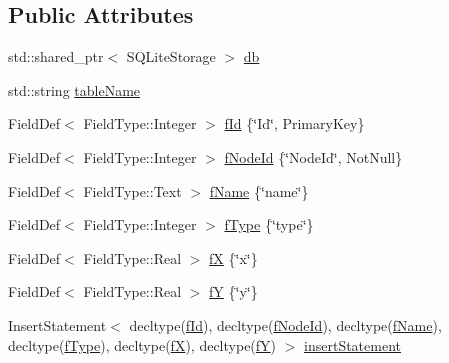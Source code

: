 \subsection*{Public Attributes}
\begin{DoxyCompactItemize}
\item 
std\+::shared\+\_\+ptr$<$ S\+Q\+Lite\+Storage $>$ \mbox{\hyperlink{struct_fish_farms_def_table_1_1_impl_a303f07f885e2da16d0db672caa8b9415}{db}}
\item 
std\+::string \mbox{\hyperlink{struct_fish_farms_def_table_1_1_impl_a96002972a7a89dfbc26a22b81477f426}{table\+Name}}
\item 
Field\+Def$<$ Field\+Type\+::\+Integer $>$ \mbox{\hyperlink{struct_fish_farms_def_table_1_1_impl_ae3eeaefb826965d54a6ebf27696a67c0}{f\+Id}} \{\char`\"{}Id\char`\"{}, Primary\+Key\}
\item 
Field\+Def$<$ Field\+Type\+::\+Integer $>$ \mbox{\hyperlink{struct_fish_farms_def_table_1_1_impl_acc9e1ce4f57803601bbf172bb6499207}{f\+Node\+Id}} \{\char`\"{}Node\+Id\char`\"{}, Not\+Null\}
\item 
Field\+Def$<$ Field\+Type\+::\+Text $>$ \mbox{\hyperlink{struct_fish_farms_def_table_1_1_impl_ad8cb7e9d96f8c73c705563c9c4537b1e}{f\+Name}} \{\char`\"{}name\char`\"{}\}
\item 
Field\+Def$<$ Field\+Type\+::\+Integer $>$ \mbox{\hyperlink{struct_fish_farms_def_table_1_1_impl_a25df08564e817f991ab732f2e84af021}{f\+Type}} \{\char`\"{}type\char`\"{}\}
\item 
Field\+Def$<$ Field\+Type\+::\+Real $>$ \mbox{\hyperlink{struct_fish_farms_def_table_1_1_impl_a74ecffa210908377879c244444116dab}{fX}} \{\char`\"{}x\char`\"{}\}
\item 
Field\+Def$<$ Field\+Type\+::\+Real $>$ \mbox{\hyperlink{struct_fish_farms_def_table_1_1_impl_a7922671ffef246d44ed2c9fb4efd719d}{fY}} \{\char`\"{}y\char`\"{}\}
\item 
Insert\+Statement$<$ decltype(\mbox{\hyperlink{struct_fish_farms_def_table_1_1_impl_ae3eeaefb826965d54a6ebf27696a67c0}{f\+Id}}), decltype(\mbox{\hyperlink{struct_fish_farms_def_table_1_1_impl_acc9e1ce4f57803601bbf172bb6499207}{f\+Node\+Id}}), decltype(\mbox{\hyperlink{struct_fish_farms_def_table_1_1_impl_ad8cb7e9d96f8c73c705563c9c4537b1e}{f\+Name}}), decltype(\mbox{\hyperlink{struct_fish_farms_def_table_1_1_impl_a25df08564e817f991ab732f2e84af021}{f\+Type}}), decltype(\mbox{\hyperlink{struct_fish_farms_def_table_1_1_impl_a74ecffa210908377879c244444116dab}{fX}}), decltype(\mbox{\hyperlink{struct_fish_farms_def_table_1_1_impl_a7922671ffef246d44ed2c9fb4efd719d}{fY}}) $>$ \mbox{\hyperlink{struct_fish_farms_def_table_1_1_impl_aa17a01820d262320ff37a82eefb77c47}{insert\+Statement}}

\end{DoxyCompactItemize}
